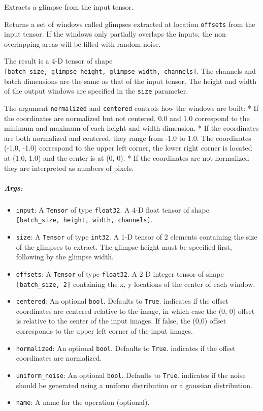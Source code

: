 Extracts a glimpse from the input tensor.

Returns a set of windows called glimpses extracted at location
\texttt{offsets} from the input tensor. If the windows only partially
overlaps the inputs, the non overlapping areas will be filled with
random noise.

The result is a 4-D tensor of shape
\texttt{{[}batch\_size,\ glimpse\_height,\ glimpse\_width,\ channels{]}}.
The channels and batch dimensions are the same as that of the input
tensor. The height and width of the output windows are specified in the
\texttt{size} parameter.

The argument \texttt{normalized} and \texttt{centered} controls how the
windows are built: * If the coordinates are normalized but not centered,
0.0 and 1.0 correspond to the minimum and maximum of each height and
width dimension. * If the coordinates are both normalized and centered,
they range from -1.0 to 1.0. The coordinates (-1.0, -1.0) correspond to
the upper left corner, the lower right corner is located at (1.0, 1.0)
and the center is at (0, 0). * If the coordinates are not normalized
they are interpreted as numbers of pixels.

\subparagraph{Args: }\label{args-13}

\begin{itemize}
\tightlist
\item
  \texttt{input}: A \texttt{Tensor} of type \texttt{float32}. A 4-D
  float tensor of shape
  \texttt{{[}batch\_size,\ height,\ width,\ channels{]}}.
\item
  \texttt{size}: A \texttt{Tensor} of type \texttt{int32}. A 1-D tensor
  of 2 elements containing the size of the glimpses to extract. The
  glimpse height must be specified first, following by the glimpse
  width.
\item
  \texttt{offsets}: A \texttt{Tensor} of type \texttt{float32}. A 2-D
  integer tensor of shape \texttt{{[}batch\_size,\ 2{]}} containing the
  x, y locations of the center of each window.
\item
  \texttt{centered}: An optional \texttt{bool}. Defaults to
  \texttt{True}. indicates if the offset coordinates are centered
  relative to the image, in which case the (0, 0) offset is relative to
  the center of the input images. If false, the (0,0) offset corresponds
  to the upper left corner of the input images.
\item
  \texttt{normalized}: An optional \texttt{bool}. Defaults to
  \texttt{True}. indicates if the offset coordinates are normalized.
\item
  \texttt{uniform\_noise}: An optional \texttt{bool}. Defaults to
  \texttt{True}. indicates if the noise should be generated using a
  uniform distribution or a gaussian distribution.
\item
  \texttt{name}: A name for the operation (optional).
\end{itemize}


